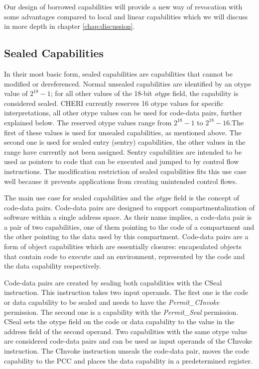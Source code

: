 Our design of borrowed capabilities will provide a new way of revocation with some advantages compared to local and linear capabilities which we will discuss in more depth in chapter \ref{chap:discussion}.

\subsection{Sealed Capabilities}
\label{sec:sealed}
In their most basic form, sealed capabilities are capabilities that cannot be modified or dereferenced. Normal unsealed capabilities are identified by an otype value of $2^{18} - 1$; for all other values of the 18-bit \textit{otype} field, the capability is considered sealed. CHERI currently reserves 16 otype values for specific interpretations, all other otype values can be used for code-data pairs, further explained below. The reserved otype values range from $2^{18} - 1$ to $2^{18} - 16$.The first of these values is used for unsealed capabilities, as mentioned above. The second one is used for sealed entry (sentry) capabilities, the other values in the range have currently not been assigned. Sentry capabilities are intended to be used as pointers to code that can be executed and jumped to by control flow instructions. The modification restriction of sealed capabilities fits this use case well because it prevents applications from creating unintended control flows.

The main use case for sealed capabilities and the \textit{otype} field is the concept of code-data pairs. Code-data pairs are designed to support compartmentalization of software within a single address space. As their name implies, a code-data pair is a pair of two capabilities, one of them pointing to the code of a compartment and the other pointing to the data used by this compartment. Code-data pairs are a form of object capabilities which are essentially closures: encapsulated objects that contain code to execute and an environment, represented by the code and the data capability respectively.

Code-data pairs are created by sealing both capabilities with the CSeal instruction. This instruction takes two input operands. The first one is the code or data capability to be sealed and needs to have the \textit{Permit\_CInvoke} permission. The second one is a capability with the \textit{Permit\_Seal} permission. CSeal sets the otype field on the code or data capability to the value in the address field of the second operand. Two capabilities with the same otype value are considered code-data pairs and can be used as input operands of the CInvoke instruction. The CInvoke instruction unseals the code-data pair, moves the code capability to the PCC and places the data capability in a predetermined register.

